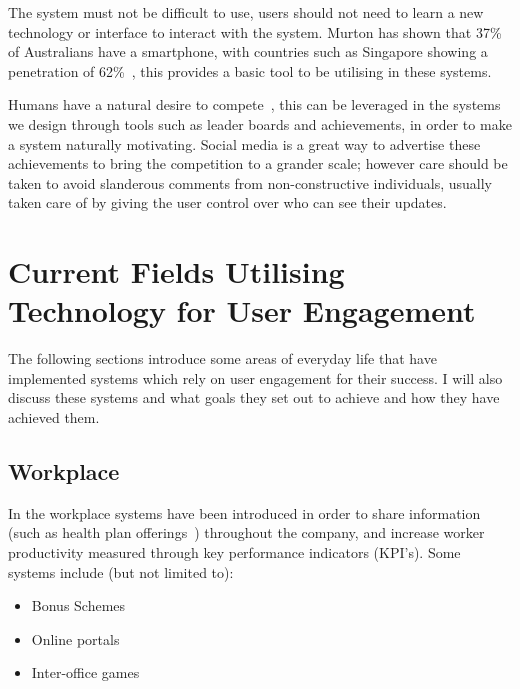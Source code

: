 \documentclass[a4paper,12pt]{article}
\begin{document}
\par
The system must not be difficult to use, users should not need to learn a new technology or interface to interact with the system. 
Murton has shown that 37\% of Australians have a smartphone, with countries such as Singapore showing a penetration of 62\%~\citep{smartphone-use-in-au}, this provides a basic tool to be utilising in these systems.

\par
Humans have a natural desire to compete~\citep{bread-and-games}, this can be leveraged in the systems we design through tools such as leader boards and achievements, in order to make a system naturally motivating.
Social media is a great way to advertise these achievements to bring the competition to a grander scale; however care should be taken to avoid slanderous comments from non-constructive individuals, usually taken care of by giving the user control over who can see their updates.

\section{Current Fields Utilising Technology for User Engagement}\label{sec:current-fields}
The following sections introduce some areas of everyday life that have implemented systems which rely on user engagement for their success. 
I will also discuss these systems and what goals they set out to achieve and how they have achieved them.

\subsection{Workplace}

In the workplace systems have been introduced in order to share information (such as health plan offerings~\citep{taxonomy-of-gamification})  throughout the company, and increase worker productivity measured through key performance indicators (KPI's).
Some systems include (but not limited to):
\begin{itemize}
	\item{Bonus Schemes}
	\item{Online portals~\citep{taxonomy-of-gamification}}
	\item{Inter-office games~\citep{taskville}}
\end{itemize}
\end{document}
